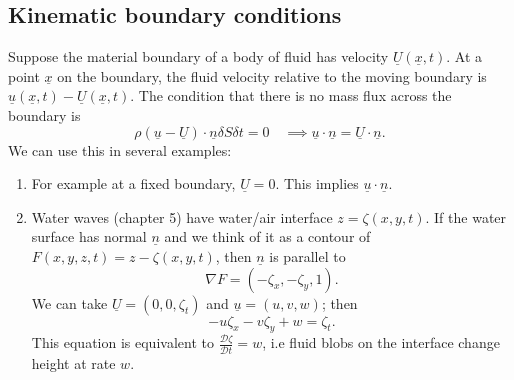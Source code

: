 \documentclass[egregdoesnotlikesansseriftitles,a4paper]{scrartcl}
\renewcommand{\vec}[1]{\underline{#1}}
\begin{document}
\subsection{Kinematic boundary conditions}
Suppose the material boundary of a body of fluid has velocity $\vec{U} (\vec{x},t)$. At a point $\vec{x}$ on the boundary, the fluid velocity relative to the moving boundary is $\vec{u} (\vec{x},t)-\vec{U} (\vec{x}, t)$. The condition that there is no mass flux across the boundary is \[
\rho (\vec{u}-\vec{U})\cdot \vec{n} \delta S \delta t=0 \quad \implies \vec{u}\cdot \vec{n}=\vec{U}\cdot \vec{n}
.\] We can use this in several examples: 
\begin{enumerate}
    \item For example at a fixed boundary, $\vec{U}=0$. This implies $\vec{u} \cdot \vec{n}$.
    \item Water waves (chapter 5) have water/air interface $z=\zeta (x,y,t)$. If the water surface has normal $\vec{n}$ and we think of it as a contour of $F (x,y,z,t)=z- \zeta (x,y,t)$, then $\vec{n}$ is parallel to \[
    \nabla F= (-\zeta_{x},-\zeta_{y}, 1 )
    .\] We can take $\vec{U}=(0,0,\zeta_{t})$ and $\vec{u}=(u,v,w)$; then \[
    -u \zeta_{x}-v \zeta_{y}+w= \zeta_{t}
    .\] This equation is equivalent to $ \frac{\mathcal{D}\zeta}{\mathcal{D}t}=w$, i.e fluid blobs on the interface change height at rate $w$. 
\end{enumerate}
\end{document}
